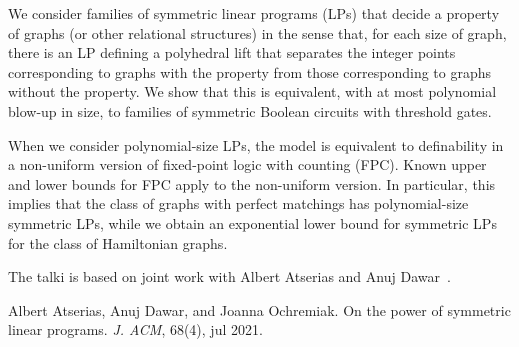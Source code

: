\documentclass[bsl,meeting]{asl}
\def\urladdr#1{\endgraf\noindent{\it URL Address}: {\tt #1}.}
\newcommand{\NP}{}
\begin{document}
\thispagestyle{empty}


\NP%
%
%
%
%


We consider families of symmetric linear programs (LPs) that decide a property of graphs (or other relational structures) in the sense that, for each size of graph, there is an LP defining a polyhedral lift that separates the integer points corresponding to graphs with the property from those corresponding to graphs without the property. We show that this is equivalent, with at most polynomial blow-up in size, to families of symmetric Boolean circuits with threshold gates.

When we consider polynomial-size LPs, the model is equivalent to definability in a non-uniform version of fixed-point logic with counting (FPC). Known upper and lower bounds for FPC apply to the non-uniform version. In particular, this implies that the class of graphs with perfect matchings has polynomial-size symmetric LPs, while we obtain an exponential lower bound for symmetric LPs for the class of Hamiltonian graphs.

The talki is based on joint work with Albert Atserias and Anuj Dawar~\cite{10.1145/3456297}.

\begin{thebibliography}{1}
 Albert Atserias, Anuj Dawar, and Joanna Ochremiak. On the power of symmetric linear programs. \emph{J. ACM}, 68(4), jul 2021.
\end{thebibliography}
\end{document}
